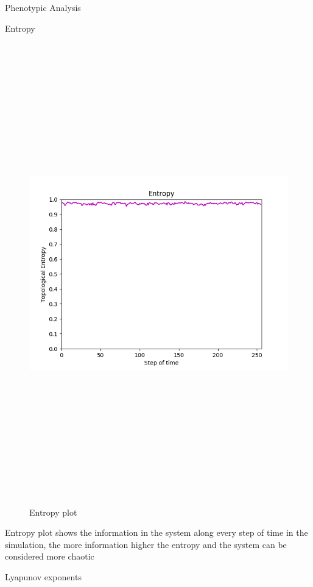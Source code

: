 \documentclass[12pt, letterpaper]{article}
\begin{document}
\begin{section}{Phenotypic Analysis}
\begin{subsection}{Entropy}
\begin{figure}[H]
			\includegraphics[max width=200mm, max height=200mm, keepaspectratio]{SimEntropy.png} 
		\caption{Entropy plot} 
		\end{figure} 
	\end{subsection}
Entropy plot shows the information in the system along every step of time in the simulation, the more information higher the entropy and the system can be considered more chaotic	\begin{subsection}{Lyapunov exponents} 
		\begin{figure}[H] 
		\centering 

\end{figure}
\end{subsection}
\end{section}
\end{document}
